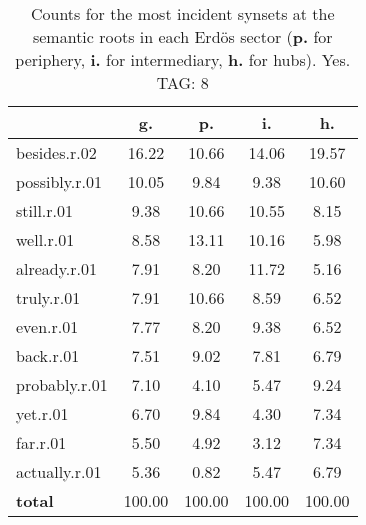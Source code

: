 \begin{table}[h!]
\begin{center}
\begin{tabular}{| l | c | c | c | c |}\hline
 & g. & p. & i. & h. \\\hline
besides.r.02 & 16.22  & 10.66  & 14.06  & 19.57 \\\hline
possibly.r.01 & 10.05  & 9.84  & 9.38  & 10.60 \\\hline
still.r.01 & 9.38  & 10.66  & 10.55  & 8.15 \\\hline
well.r.01 & 8.58  & 13.11  & 10.16  & 5.98 \\\hline
already.r.01 & 7.91  & 8.20  & 11.72  & 5.16 \\\hline
truly.r.01 & 7.91  & 10.66  & 8.59  & 6.52 \\\hline
even.r.01 & 7.77  & 8.20  & 9.38  & 6.52 \\\hline
back.r.01 & 7.51  & 9.02  & 7.81  & 6.79 \\\hline
probably.r.01 & 7.10  & 4.10  & 5.47  & 9.24 \\\hline
yet.r.01 & 6.70  & 9.84  & 4.30  & 7.34 \\\hline
far.r.01 & 5.50  & 4.92  & 3.12  & 7.34 \\\hline
actually.r.01 & 5.36  & 0.82  & 5.47  & 6.79 \\\hline
{{\bf total}} & 100.00  & 100.00  & 100.00  & 100.00 \\\hline
\end{tabular}
\caption{Counts for the most incident synsets at the semantic roots in each Erd\"os sector ({\bf p.} for periphery, {\bf i.} for intermediary, {\bf h.} for hubs). Yes. TAG: 8}
\end{center}
\end{table}